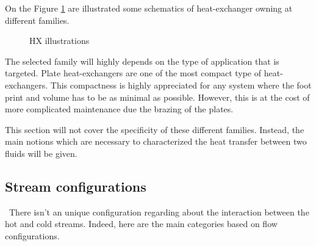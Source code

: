 On the Figure \ref{fig:C3_HX} are illustrated some schematics of heat-exchanger owning at different families.
\begin{figure}[h]
    \centering
    \hfill
    \hfill
    \caption{HX illustrations} \label{fig:C3_HX}
\end{figure}

The selected family will highly depends on the type of application that is targeted. Plate heat-exchangers are one of the most compact type of heat-exchangers. This compactness is highly appreciated for any system where the foot print and volume has to be as minimal as possible. However, this is at the cost of more complicated maintenance due the brazing of the plates.

This section will not cover the specificity of these different families. Instead, the main notions which are necessary to characterized the heat transfer between two fluids will be given.

\subsection{Stream configurations}
\quad\ There isn't an unique configuration regarding about the interaction between the hot and cold streams. Indeed, here are the main categories based on flow configurations.

